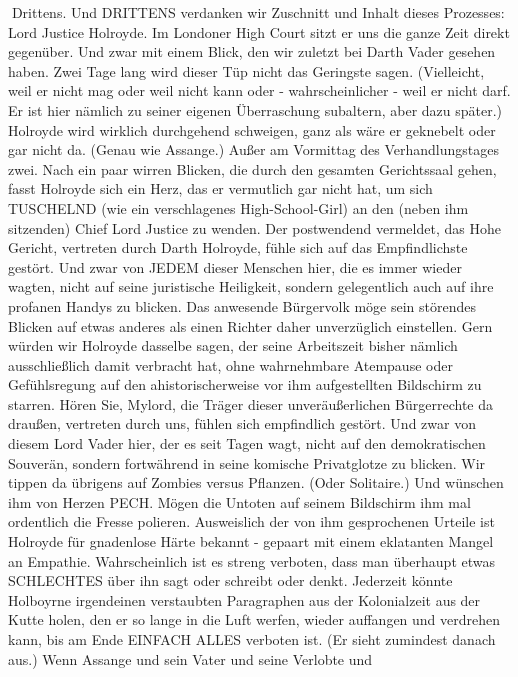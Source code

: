 \begin{multicols}{2}
Drittens.
Und DRITTENS verdanken wir Zuschnitt und Inhalt dieses Prozesses: Lord Justice Holroyde. Im Londoner High
Court sitzt er uns die ganze Zeit direkt gegenüber. Und
zwar mit einem Blick, den wir zuletzt bei Darth Vader gesehen haben. Zwei Tage lang wird dieser Tüp nicht das
Geringste sagen. (Vielleicht, weil er nicht mag oder weil
nicht kann oder - wahrscheinlicher - weil er nicht darf.
Er ist hier nämlich zu seiner eigenen Überraschung subaltern, aber dazu später.)
Holroyde wird wirklich durchgehend schweigen, ganz
als wäre er geknebelt oder gar nicht da. (Genau wie Assange.) Außer am Vormittag des Verhandlungstages zwei.
Nach ein paar wirren Blicken, die durch den gesamten
Gerichtssaal gehen, fasst Holroyde sich ein Herz, das er
vermutlich gar nicht hat, um sich TUSCHELND (wie ein
verschlagenes High-School-Girl) an den (neben ihm sitzenden) Chief Lord Justice zu wenden.
Der postwendend vermeldet, das Hohe Gericht, vertreten durch Darth Holroyde, fühle sich auf das Empfindlichste gestört. Und zwar von JEDEM dieser Menschen
hier, die es immer wieder wagten, nicht auf seine juristische Heiligkeit, sondern gelegentlich auch auf ihre
profanen Handys zu blicken. Das anwesende Bürgervolk
möge sein störendes Blicken auf etwas anderes als einen
Richter daher unverzüglich einstellen.
Gern würden wir Holroyde dasselbe sagen, der seine Arbeitszeit bisher nämlich ausschließlich damit verbracht
hat, ohne wahrnehmbare Atempause oder Gefühlsregung auf den ahistorischerweise vor ihm aufgestellten
Bildschirm zu starren. Hören Sie, Mylord, die Träger
dieser unveräußerlichen Bürgerrechte da draußen, vertreten durch uns, fühlen sich empfindlich gestört. Und
zwar von diesem Lord Vader hier, der es seit Tagen wagt,
nicht auf den demokratischen Souverän, sondern fortwährend in seine komische Privatglotze zu blicken.
Wir tippen da übrigens auf Zombies versus Pflanzen.
(Oder Solitaire.) Und wünschen ihm von Herzen PECH.
Mögen die Untoten auf seinem Bildschirm ihm mal ordentlich die Fresse polieren.
Ausweislich der von ihm gesprochenen Urteile ist Holroyde für gnadenlose Härte bekannt - gepaart mit einem
eklatanten Mangel an Empathie. Wahrscheinlich ist es
streng verboten, dass man überhaupt etwas SCHLECHTES über ihn sagt oder schreibt oder denkt. Jederzeit
könnte Holboyrne irgendeinen verstaubten Paragraphen aus der Kolonialzeit aus der Kutte holen, den er so
lange in die Luft werfen, wieder auffangen und verdrehen kann, bis am Ende EINFACH ALLES verboten ist. (Er
sieht zumindest danach aus.)
Wenn Assange und sein Vater und seine Verlobte und


\end{multicols}
